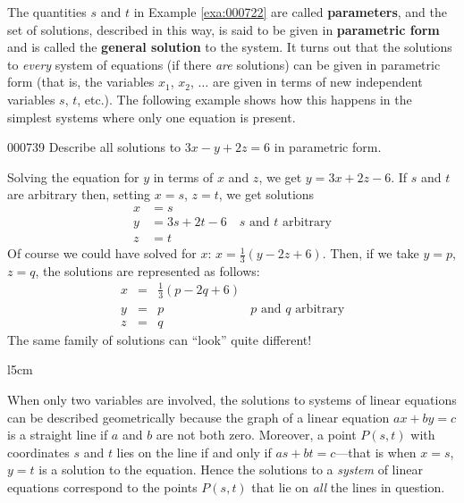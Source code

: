 The quantities $s$ and $t$ in Example \ref{exa:000722} are called \textbf{parameters}, and the set of solutions, described in this way, is said to be given in \textbf{parametric form} and is called the \textbf{general solution} to the system. It turns out that the solutions to \textit{every} system of equations (if there \textit{are} solutions) can be given in parametric form (that is, the variables $x_1$, $x_2$, $ \dots $  are given in terms of new independent variables $s$, $t$, etc.). The following example shows how this happens in the simplest systems where only one equation is present.

\begin{example}{}{000739}
Describe all solutions to $3x - y + 2z = 6$ in parametric form.

\begin{solution}
Solving the equation for $y$ in terms of $x$ and $z$, we get $y = 3x + 2z -6$. If $s$ and $t$ are arbitrary then, setting $x = s$, $z = t$, we get solutions
\begin{align*}
	x &= s\\
	y &= 3s + 2t -6 \quad s \mbox{ and } t \mbox{ arbitrary} \\
	z &= t
\end{align*}
Of course we could have solved for $x$: $x = \frac{1}{3}(y -2z + 6)$. Then, if we take $y = p$, $z = q$, the solutions are represented as follows:
\begin{equation*}
\begin{array}{rlll}
	x & = & \frac{1}{3} (p - 2q + 6) & \\
	y & = & p & p \mbox{ and } q \mbox{ arbitrary}\\
	z & = & q & 
\end{array}
\end{equation*}
The same family of solutions can ``look'' quite different!
\end{solution}
\end{example}

\begin{wrapfigure}[30]{l}{5cm}
\centering

\caption{\label{fig:000759}}
\end{wrapfigure}

When only two variables are involved, the solutions to systems of linear equations can be described geometrically because the graph of a linear equation $ax + by = c$ is a straight line if $a$ and $b$ are not both zero. Moreover, a point $P(s, t)$ with coordinates $s$ and $t$ lies on the line if and only if $as + bt = c$---that is when $x = s$, $y = t$ is a solution to the equation. Hence the solutions to a \textit{system} of linear equations correspond to the points $P(s, t)$ that lie on \textit{all} the lines in question.

